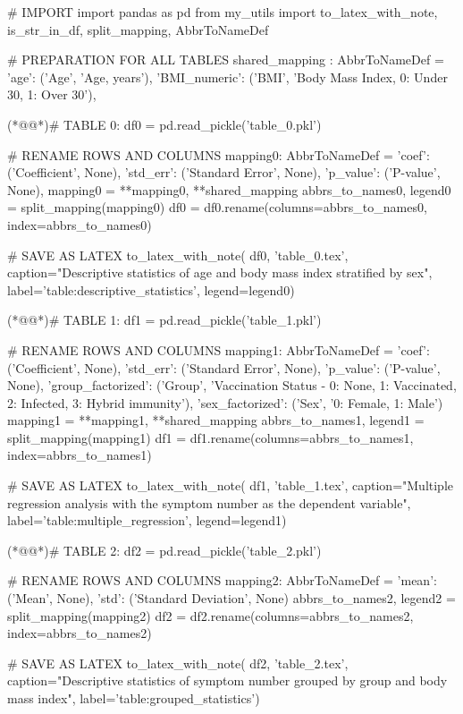 \documentclass[11pt]{article}
\begin{document}
\begin{python}

# IMPORT
import pandas as pd
from my_utils import to_latex_with_note, is_str_in_df, split_mapping, AbbrToNameDef

# PREPARATION FOR ALL TABLES
shared_mapping : AbbrToNameDef = {
   'age': ('Age', 'Age, years'),
   'BMI_numeric': ('BMI', 'Body Mass Index, 0: Under 30, 1: Over 30'),
}

(*@@*)# TABLE 0:
df0 = pd.read_pickle('table_0.pkl')

# RENAME ROWS AND COLUMNS
mapping0: AbbrToNameDef = {
    'coef': ('Coefficient', None),
    'std_err': ('Standard Error', None),
    'p_value': ('P-value', None),
}
mapping0 = {**mapping0, **shared_mapping}
abbrs_to_names0, legend0 = split_mapping(mapping0)
df0 = df0.rename(columns=abbrs_to_names0, index=abbrs_to_names0)

# SAVE AS LATEX
to_latex_with_note(
   df0, 'table_0.tex',
   caption="Descriptive statistics of age and body mass index stratified by sex", 
   label='table:descriptive_statistics',
   legend=legend0)


(*@@*)# TABLE 1:
df1 = pd.read_pickle('table_1.pkl')

# RENAME ROWS AND COLUMNS
mapping1: AbbrToNameDef = {
   'coef': ('Coefficient', None),
   'std_err': ('Standard Error', None),
   'p_value': ('P-value', None),
   'group_factorized': ('Group', 'Vaccination Status - 0: None, 1: Vaccinated, 2: Infected, 3: Hybrid immunity'),
   'sex_factorized': ('Sex', '0: Female, 1: Male')
}
mapping1 = {**mapping1, **shared_mapping}
abbrs_to_names1, legend1 = split_mapping(mapping1)
df1 = df1.rename(columns=abbrs_to_names1, index=abbrs_to_names1)

# SAVE AS LATEX
to_latex_with_note(
   df1, 'table_1.tex',
   caption="Multiple regression analysis with the symptom number as the dependent variable", 
   label='table:multiple_regression',
   legend=legend1)

(*@@*)# TABLE 2:
df2 = pd.read_pickle('table_2.pkl')

# RENAME ROWS AND COLUMNS
mapping2: AbbrToNameDef = {
   'mean': ('Mean', None),
   'std': ('Standard Deviation', None)
}
abbrs_to_names2, legend2 = split_mapping(mapping2)
df2 = df2.rename(columns=abbrs_to_names2, index=abbrs_to_names2)

# SAVE AS LATEX
to_latex_with_note(
   df2, 'table_2.tex',
   caption="Descriptive statistics of symptom number grouped by group and body mass index", 
   label='table:grouped_statistics')

\end{python}
\end{document}
